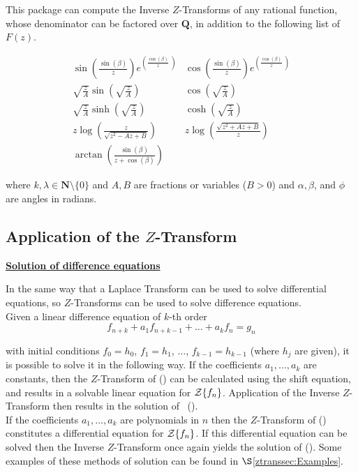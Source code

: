 This package can compute the Inverse $Z$-Transforms of any rational
function, whose denominator can be factored over $\mathbf{Q}$, in
addition to the following list of $F(z)$.

{\setlength{\arraycolsep}{1cm}
\[
\renewcommand{\arraystretch}{2}
\begin{array}{cc}
  \sin \left(\frac{\sin (\beta)}{z} \right) e^{\left(\frac{\cos (\beta)}{z} \ \right)}
  & \cos \left(\frac{\sin (\beta)}{z} \right) e^{\left(\frac{\cos (\beta)}{z} \ \right)} \\
  \sqrt{\frac{z}{A}} \sin \left( \sqrt{\frac{z}{A}} \right)
  & \cos \left( \sqrt{\frac{z}{A}} \right) \\
  \sqrt{\frac{z}{A}} \sinh \left( \sqrt{\frac{z}{A}} \right)
  & \cosh \left( \sqrt{\frac{z}{A}} \right) \\
  z \log \left(\frac{z}{\sqrt{z^2-A z+B}} \right)
  & z \log \left(\frac{\sqrt{z^2+A z+B}}{z} \right) \\
  \arctan \left(\frac{\sin (\beta)}{z+\cos (\beta)} \right)
\end{array}
\]}

where $k,\lambda \in \mathbf{N} \setminus \{0\}$ and $A,B$ are fractions or
variables ($B>0$) and $\alpha,\beta$, and $\phi$ are angles in
radians.

\subsection[Application of the Z-Transform]{Application of the $Z$-Transform}
\underline {{\bf Solution of difference equations}}

  In the same way that a Laplace Transform can be used to
  solve differential equations, so $Z$-Transforms can be used
  to solve difference equations.\\
  Given a linear difference equation of $k$-th order
\begin{equation}
  f_{n+k} + a_1 f_{n+k-1}+ \ldots + a_k f_n = g_n
\label{eq:1}
\end{equation}

  with initial conditions
  $f_0 = h_0$, $f_1 = h_1$, $\ldots$, $f_{k-1} = h_{k-1}$ (where $h_j$
  are given), it is possible to solve it in the following way.
   If the coefficients $a_1, \ldots , a_k$ are constants, then the
  $Z$-Transform of () can be calculated using the shift
  equation, and results in a solvable linear equation for
  ${\cal Z} \{f_n\}$. Application of the Inverse $Z$-Transform
  then results in the solution of \ ().\\
  If the coefficients $a_1, \ldots , a_k$ are polynomials in $n$ then
  the $Z$-Transform of () constitutes a differential
  equation for ${\cal Z} \{f_n\}$. If this differential equation can
  be solved then the Inverse $Z$-Transform once again yields the
  solution of ().
  Some examples of these methods of solution can be found in
  $\S$\ref{ztranssec:Examples}.

